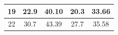 \documentclass{article}
\begin{document}
\begin{Large}
\begin{table}[h]
\begin{tabular}{|c|cc|cc|}
19                                                                       & \multicolumn{1}{c|}{22.9}                                                    & 40.10                                                       & \multicolumn{1}{c|}{20.3}                                                    & 33.66                                                       \\ \hline
22                                                                       & \multicolumn{1}{c|}{30.7}                                                    & 43.39                                                       & \multicolumn{1}{c|}{27.7}                                                    & 35.58                                                       \\ \hline
\end{tabular}
\end{table}



\end{Large}
\end{document}
